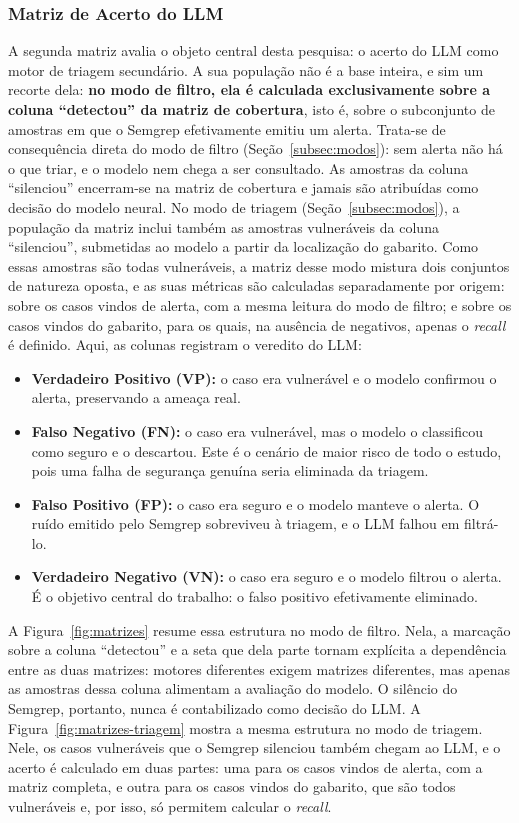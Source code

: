 \subsubsection{Matriz de Acerto do LLM}
A segunda matriz avalia o objeto central desta pesquisa: o acerto do LLM como motor de triagem secundário. A sua população não é a base inteira, e sim um recorte dela: \textbf{no modo de filtro, ela é calculada exclusivamente sobre a coluna ``detectou'' da matriz de cobertura}, isto é, sobre o subconjunto de amostras em que o Semgrep efetivamente emitiu um alerta. Trata-se de consequência direta do modo de filtro (Seção~\ref{subsec:modos}): sem alerta não há o que triar, e o modelo nem chega a ser consultado. As amostras da coluna ``silenciou'' encerram-se na matriz de cobertura e jamais são atribuídas como decisão do modelo neural. No modo de triagem (Seção~\ref{subsec:modos}), a população da matriz inclui também as amostras vulneráveis da coluna ``silenciou'', submetidas ao modelo a partir da localização do gabarito. Como essas amostras são todas vulneráveis, a matriz desse modo mistura dois conjuntos de natureza oposta, e as suas métricas são calculadas separadamente por origem: sobre os casos vindos de alerta, com a mesma leitura do modo de filtro; e sobre os casos vindos do gabarito, para os quais, na ausência de negativos, apenas o \textit{recall} é definido. Aqui, as colunas registram o veredito do LLM:
\begin{itemize}
\item \textbf{Verdadeiro Positivo (VP):} o caso era vulnerável e o modelo confirmou o alerta, preservando a ameaça real.
\item \textbf{Falso Negativo (FN):} o caso era vulnerável, mas o modelo o classificou como seguro e o descartou. Este é o cenário de maior risco de todo o estudo, pois uma falha de segurança genuína seria eliminada da triagem.
\item \textbf{Falso Positivo (FP):} o caso era seguro e o modelo manteve o alerta. O ruído emitido pelo Semgrep sobreviveu à triagem, e o LLM falhou em filtrá-lo.
\item \textbf{Verdadeiro Negativo (VN):} o caso era seguro e o modelo filtrou o alerta. É o objetivo central do trabalho: o falso positivo efetivamente eliminado.
\end{itemize}

A Figura~\ref{fig:matrizes} resume essa estrutura no modo de filtro. Nela, a marcação sobre a coluna ``detectou'' e a seta que dela parte tornam explícita a dependência entre as duas matrizes: motores diferentes exigem matrizes diferentes, mas apenas as amostras dessa coluna alimentam a avaliação do modelo. O silêncio do Semgrep, portanto, nunca é contabilizado como decisão do LLM. A Figura~\ref{fig:matrizes-triagem} mostra a mesma estrutura no modo de triagem. Nele, os casos vulneráveis que o Semgrep silenciou também chegam ao LLM, e o acerto é calculado em duas partes: uma para os casos vindos de alerta, com a matriz completa, e outra para os casos vindos do gabarito, que são todos vulneráveis e, por isso, só permitem calcular o \textit{recall}.

